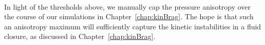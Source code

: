 \\
In light of the thresholds above, we manually cap the pressure anisotropy over the course of our simulations in Chapter~\ref{chap:kinBrag}. The hope is that such an anisotropy maximum will sufficiently capture the kinetic instabilities in a fluid closure, as discussed in Chapter~\ref{chap:kinBrag}.












